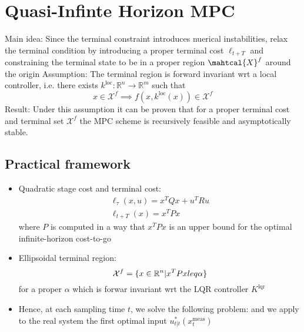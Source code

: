 \documentclass{book}
\newcommand{\R}{\mathbb{R}}
\theoremstyle{definition}
\theoremstyle{remark}
\theoremstyle{remark}
\begin{document}
\section{Quasi-Infinte Horizon MPC}
Main idea: Since the terminal constraint introduces nuerical instabilities, relax the terminal condition by introducing a proper terminal cost $\ell_{t+T}$ and constraining the terminal state to be in a proper region $\mahtcal{X}^f$ around the origin
Assumption: The terminal region is forward invariant wrt a local controller, i.e. there exists $k^{\text{loc}}:\R^n\to\R^m$ such that 
\[
    x\in\mathcal{X}^f \implies f(x,k^{\text{loc}}(x))\in\mathcal{X}^f
\]
Result: Under this assumption it can be proven that for a proper terminal cost and terminal set $\mathcal{X}^f$ the MPC scheme is recursively feasible and asymptotically stable.
\subsection{Practical framework}
\begin{itemize}
    \item Quadratic stage cost and terminal cost: 
        \begin{align*}
            \ell_\tau(x,u)=x^TQx+u^TRu\\
            \ell_{t+T}(x) = x^TPx
        \end{align*}
        where $P$ is computed in a way that $x^TPx$ is an upper bound for the optimal infinite-horizon cost-to-go
    \item Ellipsoidal terminal region: 
        \[
            \mathcal{X}^f = \{x\in\R^n|x^TPx\\leq\alpha\}
        \]
        for a proper $\alpha$ which is forwar invariant wrt the LQR controller $K^{\text{lqr}}$
    \item Hence, at each sampling time $t$, we solve the following problem: 
        and we apply to the real system the first optimal input $u^*_{t|t}(x_t^{\text{meas}})$
\end{itemize}
\end{document}
